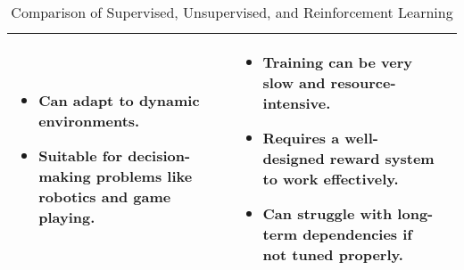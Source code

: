 \begin{table}[h]
\begin{tabular}{| m{3.5cm} | m{5cm} | m{5cm} |}
\begin{itemize}
                  \item Can adapt to dynamic environments.
                  \item Suitable for decision-making problems like robotics and game playing.
            \end{itemize} & 
            \begin{itemize}
                  \item Training can be very slow and resource-intensive.
                  \item Requires a well-designed reward system to work effectively.
                  \item Can struggle with long-term dependencies if not tuned properly.
            \end{itemize} \\ 
            \hline
      \end{tabular}
      \caption{Comparison of Supervised, Unsupervised, and Reinforcement Learning}
      \label{tab:ml_comparison}
\end{table}





